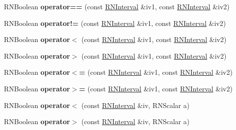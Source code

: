 \begin{DoxyCompactItemize}
\item 
R\+N\+Boolean {\bfseries operator==} (const \hyperlink{class_r_n_interval}{R\+N\+Interval} \&iv1, const \hyperlink{class_r_n_interval}{R\+N\+Interval} \&iv2)\hypertarget{class_r_n_interval_a65fc9d7f4310daae6c1940f5d9a64d16}{}\label{class_r_n_interval_a65fc9d7f4310daae6c1940f5d9a64d16}

\item 
R\+N\+Boolean {\bfseries operator!=} (const \hyperlink{class_r_n_interval}{R\+N\+Interval} \&iv1, const \hyperlink{class_r_n_interval}{R\+N\+Interval} \&iv2)\hypertarget{class_r_n_interval_a7c93225352f75ff48cedf2ef36d81d00}{}\label{class_r_n_interval_a7c93225352f75ff48cedf2ef36d81d00}

\item 
R\+N\+Boolean {\bfseries operator$<$} (const \hyperlink{class_r_n_interval}{R\+N\+Interval} \&iv1, const \hyperlink{class_r_n_interval}{R\+N\+Interval} \&iv2)\hypertarget{class_r_n_interval_a74862f685ec0c24f850f8ec1e39a1cea}{}\label{class_r_n_interval_a74862f685ec0c24f850f8ec1e39a1cea}

\item 
R\+N\+Boolean {\bfseries operator$>$} (const \hyperlink{class_r_n_interval}{R\+N\+Interval} \&iv1, const \hyperlink{class_r_n_interval}{R\+N\+Interval} \&iv2)\hypertarget{class_r_n_interval_a753b3cfa0bb3c979bc82e55b58665b9b}{}\label{class_r_n_interval_a753b3cfa0bb3c979bc82e55b58665b9b}

\item 
R\+N\+Boolean {\bfseries operator$<$=} (const \hyperlink{class_r_n_interval}{R\+N\+Interval} \&iv1, const \hyperlink{class_r_n_interval}{R\+N\+Interval} \&iv2)\hypertarget{class_r_n_interval_a2467a1ace749794146c813ef854baba4}{}\label{class_r_n_interval_a2467a1ace749794146c813ef854baba4}

\item 
R\+N\+Boolean {\bfseries operator$>$=} (const \hyperlink{class_r_n_interval}{R\+N\+Interval} \&iv1, const \hyperlink{class_r_n_interval}{R\+N\+Interval} \&iv2)\hypertarget{class_r_n_interval_a80649e3d20e2b81879b1661f8dad2798}{}\label{class_r_n_interval_a80649e3d20e2b81879b1661f8dad2798}

\item 
R\+N\+Boolean {\bfseries operator$<$} (const \hyperlink{class_r_n_interval}{R\+N\+Interval} \&iv, R\+N\+Scalar a)\hypertarget{class_r_n_interval_aadd6c9c96062270a5a848e2e91928978}{}\label{class_r_n_interval_aadd6c9c96062270a5a848e2e91928978}

\item 
R\+N\+Boolean {\bfseries operator$>$} (const \hyperlink{class_r_n_interval}{R\+N\+Interval} \&iv, R\+N\+Scalar a)\hypertarget{class_r_n_interval_ac9dd78a310bf9fdeb3d8afdde6c7721a}{}\label{class_r_n_interval_ac9dd78a310bf9fdeb3d8afdde6c7721a}


\end{DoxyCompactItemize}
